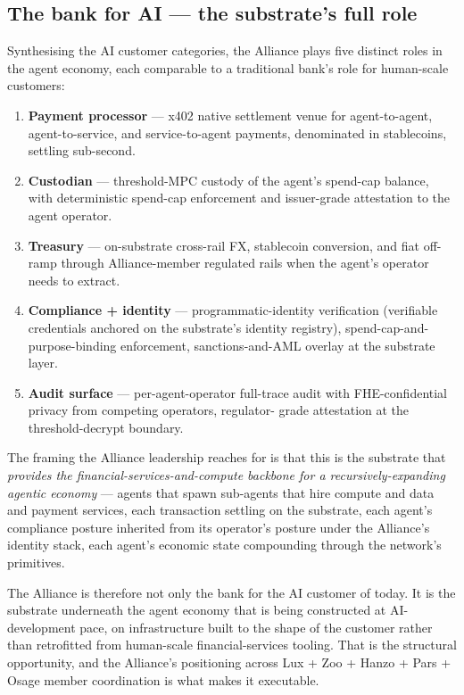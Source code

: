 \subsection{The bank for AI --- the substrate's full role}

Synthesising the AI customer categories, the Alliance plays five
distinct roles in the agent economy, each comparable to a traditional
bank's role for human-scale customers:

\begin{enumerate}[leftmargin=2em,itemsep=0.1em]
\item \textbf{Payment processor} --- x402 native settlement venue for
agent-to-agent, agent-to-service, and service-to-agent payments,
denominated in stablecoins, settling sub-second.
\item \textbf{Custodian} --- threshold-MPC custody of the agent's
spend-cap balance, with deterministic spend-cap enforcement and
issuer-grade attestation to the agent operator.
\item \textbf{Treasury} --- on-substrate cross-rail FX, stablecoin
conversion, and fiat off-ramp through Alliance-member regulated rails
when the agent's operator needs to extract.
\item \textbf{Compliance + identity} --- programmatic-identity
verification (verifiable credentials anchored on the substrate's
identity registry), spend-cap-and-purpose-binding enforcement,
sanctions-and-AML overlay at the substrate layer.
\item \textbf{Audit surface} --- per-agent-operator full-trace audit
with FHE-confidential privacy from competing operators, regulator-
grade attestation at the threshold-decrypt boundary.
\end{enumerate}

The framing the Alliance leadership reaches for is that this is the
substrate that \emph{provides the financial-services-and-compute
backbone for a recursively-expanding agentic economy} --- agents that
spawn sub-agents that hire compute and data and payment services,
each transaction settling on the substrate, each agent's compliance
posture inherited from its operator's posture under the Alliance's
identity stack, each agent's economic state compounding through the
network's primitives.

The Alliance is therefore not only the bank for the AI customer of
today. It is the substrate underneath the agent economy that is being
constructed at AI-development pace, on infrastructure built to the
shape of the customer rather than retrofitted from human-scale
financial-services tooling. That is the structural opportunity, and
the Alliance's positioning across Lux + Zoo + Hanzo + Pars + Osage
member coordination is what makes it executable.
